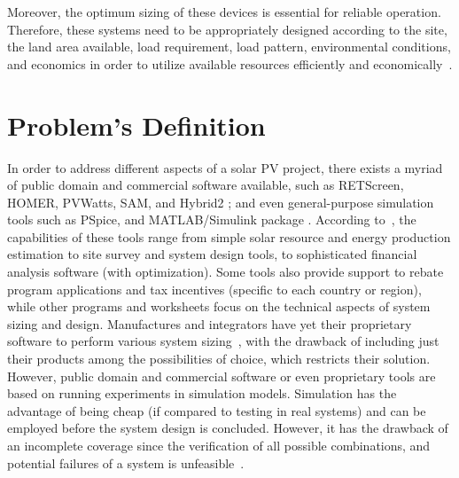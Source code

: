 Moreover, the optimum sizing of these devices is essential for reliable operation. Therefore, these systems need to be appropriately designed according to the site, the land area available, load requirement, load pattern, environmental conditions, and economics in order to utilize available resources efficiently and economically~\cite{Rawat}.

\section{Problem's Definition}

In order to address different aspects of a solar PV project, there exists a myriad of public domain and commercial software available, such as RETScreen, HOMER, PVWatts, SAM, and Hybrid2 \cite{Pradhan,Swarnkar,NRELDobos,NRELBlair,Mills}; and even general-purpose simulation tools such as PSpice, and MATLAB/Simulink package \cite{Gow1999,Benatiallah2017}. According to~\cite{Brooks}, the capabilities of these tools range from simple solar resource and energy production estimation to site survey and system design tools, to sophisticated financial analysis software (with optimization). Some tools also provide support to rebate program applications and tax incentives (specific to each country or region), while other programs and worksheets focus on the technical aspects of system sizing and design.  
%
Manufactures and integrators have yet their proprietary software to perform various system sizing~\cite{Zhou2010}, with the drawback of including just their products among the possibilities of choice, which restricts their solution. 
%
However, public domain and commercial software or even proprietary tools are based on running experiments in simulation models. Simulation has the advantage of being cheap (if compared to testing in real systems) and can be employed before the system design is concluded. However, it has the drawback of an incomplete coverage since the verification of all possible combinations, and potential failures of a system is unfeasible~\cite{ClarkeHV18}.

